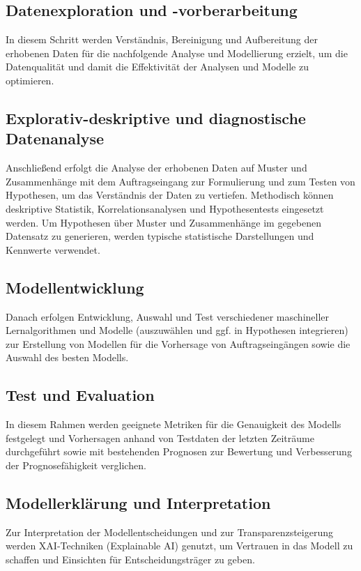 \documentclass[lettersize,journal]{IEEEtran}
\begin{document}
\subsection*{Datenexploration und -vorberarbeitung} In diesem Schritt werden Verständnis, Bereinigung und Aufbereitung der erhobenen Daten für die nachfolgende Analyse und Modellierung erzielt, um die Datenqualität und damit die Effektivität der Analysen und Modelle zu optimieren. 
\subsection*{Explorativ-deskriptive und diagnostische Datenanalyse} Anschließend erfolgt die Analyse der erhobenen Daten auf Muster und Zusammenhänge mit dem Auftragseingang zur Formulierung und zum Testen von Hypothesen, um das Verständnis der Daten zu vertiefen. Methodisch können deskriptive Statistik, Korrelationsanalysen und Hypothesentests eingesetzt werden. Um Hypothesen über Muster und Zusammenhänge im gegebenen Datensatz zu generieren, werden typische statistische Darstellungen und Kennwerte verwendet. 
\subsection*{Modellentwicklung} Danach erfolgen Entwicklung, Auswahl und Test verschiedener maschineller Lernalgorithmen und Modelle (auszuwählen und ggf. in Hypothesen integrieren) zur Erstellung von Modellen für die Vorhersage von Auftragseingängen sowie die Auswahl des besten Modells.
\subsection*{Test und Evaluation} In diesem Rahmen werden geeignete Metriken für die Genauigkeit des Modells festgelegt und Vorhersagen anhand von Testdaten der letzten Zeiträume durchgeführt sowie mit bestehenden Prognosen zur Bewertung und Verbesserung der Prognosefähigkeit verglichen.
\subsection*{Modellerklärung und Interpretation} Zur Interpretation der Modellentscheidungen und zur Transparenzsteigerung werden XAI-Techniken (Explainable AI) genutzt, um Vertrauen in das Modell zu schaffen und Einsichten für Entscheidungsträger zu geben.
\end{document}
